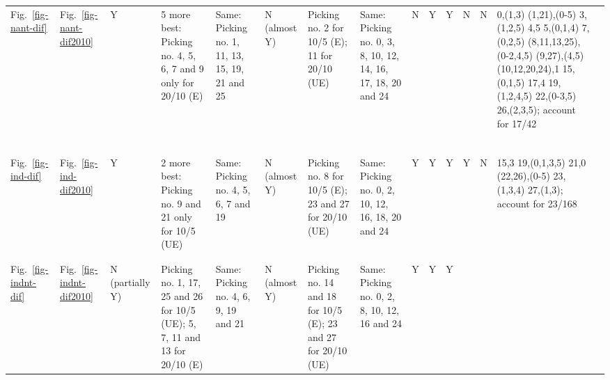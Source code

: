 \begin{table*}
{\begin{tabular}{l|l|l|l|p{2cm}|l|p{2.4cm}|l|lllllll}
Fig.~\ref{fig-nant-dif} & Fig.~\ref{fig-nant-dif2010} & Y &
  \multirow{2}{*}{\parbox{2.5cm}{5 more best: Picking no. 4, 5, 6, 7 and 9 only for 20/10 (E)}} &
  \multirow{2}{*}{\parbox{2cm}{Same: Picking no. 1, 11, 13, 15, 19, 21 and 25}} &
  \multirow{2}{*}{\parbox{1cm}{N (almost Y)}} & \multirow{2}{*}{\parbox{2cm}{Picking no. 2 for 10/5 (E); 11 for 20/10 (UE)}} &
  \multirow{2}{*}{\parbox{2cm}{Same: Picking no. 0, 3, 8, 10, 12, 14, 16, 17, 18, 20 and 24}} &
  \multicolumn{1}{l|}{N} & \multicolumn{1}{l|}{Y} & \multicolumn{1}{l|}{Y} &
  \multicolumn{1}{l|}{N} & \multicolumn{1}{l|}{N} &
  \multicolumn{1}{l|}{\multirow{2}{*}{\parbox{3cm}{0,(1,3) (1,21),(0-5)
  3,(1,2,5) 4,5 5,(0,1,4) 7,(0,2,5) (8,11,13,25),(0-2,4,5) (9,27),(4,5)
  (10,12,20,24),1 15,(0,1,5) 17,4 19,(1,2,4,5) 22,(0-3,5) 26,(2,3,5); account
  for 17/42}}} &
  \\ \\ \\ \\ \\ \\ \\ \\ \hline
Fig.~\ref{fig-ind-dif} & Fig.~\ref{fig-ind-dif2010} & Y &
  \multirow{2}{*}{\parbox{2.5cm}{2 more best: Picking no. 9 and 21 only for 10/5 (UE)}} &
  \multirow{2}{*}{\parbox{2cm}{Same: Picking no. 4, 5, 6, 7 and 19}} &
  \multirow{2}{*}{\parbox{1cm}{N (almost Y)}} &
  \multirow{2}{*}{\parbox{2.4cm}{Picking no. 8 for 10/5 (E); 23 and 27 for 20/10 (UE)}} &
  \multirow{2}{*}{\parbox{2cm}{Same: Picking no. 0, 2, 10, 12, 16, 18, 20 and 24}} &
  \multicolumn{1}{l|}{Y} & \multicolumn{1}{l|}{Y} & \multicolumn{1}{l|}{Y} &
  \multicolumn{1}{l|}{Y} & \multicolumn{1}{l|}{N} &
  \multicolumn{1}{l|}{\multirow{2}{*}{\parbox{3cm}{15,3 19,(0,1,3,5) 21,0
  (22,26),(0-5) 23,(1,3,4) 27,(1,3); account for 23/168}}} &  \\ \\ \\ \\ \hline
Fig.~\ref{fig-indnt-dif} & Fig.~\ref{fig-indnt-dif2010} &
  \multirow{2}{*}{\parbox{1cm}{N (partially Y)}} &
  \multirow{2}{*}{\parbox{2.5cm}{Picking no. 1, 17, 25 and 26 for 10/5 (UE);
  5, 7, 11 and 13 for 20/10 (E)}} & \multirow{2}{*}{\parbox{2cm}{Same:
  Picking no. 4, 6, 9, 19 and 21}} & \multirow{2}{*}{\parbox{1cm}{N (almost Y)}} &
  \multirow{2}{*}{\parbox{2.4cm}{Picking no. 14 and 18 for 10/5 (E); 23 and 27 for 20/10 (UE)}} &
  \multirow{2}{*}{\parbox{2cm}{Same: Picking no. 0, 2, 8, 10, 12, 16 and 24}} &
  \multicolumn{1}{l|}{Y} & \multicolumn{1}{l|}{Y} & \multicolumn{1}{l|}{Y} &

\end{tabular}}
\end{table*}
